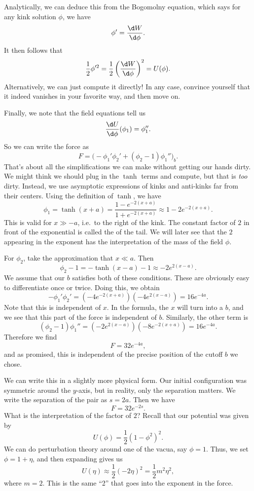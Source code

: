 \documentclass[a4paper]{article}
\begin{document}
Analytically, we can deduce this from the Bogomolny equation, which says for any kink solution $\phi$, we have
\[
  \phi' = \frac{\d W}{\d \phi}.
\]
It then follows that
\[
  \frac{1}{2} \phi'^2 = \frac{1}{2} \left(\frac{\d W}{\d \phi}\right)^2 = U(\phi).
\]
Alternatively, we can just compute it directly! In any case, convince yourself that it indeed vanishes in your favorite way, and then move on.

Finally, we note that the field equations tell us
\[
  \frac{\d U}{\d \phi}(\phi_1) = \phi_1''.
\]
So we can write the force as
\[
  F = \big(-\phi_1' \phi_2' + (\phi_2 - 1) \phi_1''\big)_b.
\]
That's about all the simplifications we can make without getting our hands dirty. We might think we should plug in the $\tanh$ terms and compute, but that is \emph{too} dirty. Instead, we use asymptotic expressions of kinks and anti-kinks far from their centers. Using the definition of $\tanh$, we have
\[
  \phi_1 = \tanh(x + a) = \frac{1 - e^{-2(x + a)}}{1 + e^{-2(x + a)}} \approx 1 - 2e^{-2(x + a)}.
\]
This is valid for $x \gg -a$, i.e.\ to the right of the kink. The constant factor of $2$ in front of the exponential is called the  of the tail. We will later see that the $2$ appearing in the exponent has the interpretation of the mass of the field $\phi$.

For $\phi_2$, take the approximation that $x \ll a$. Then
\[
  \phi_2 - 1= -\tanh(x - a) - 1 \approx -2 e^{2(x - a)}.
\]
We assume that our $b$ satisfies both of these conditions. These are obviously easy to differentiate once or twice. Doing this, we obtain
\[
  -\phi_1' \phi_2' = (-4e^{-2(x + a)})(-4 e^{2(x - a)}) = 16 e^{-4a}.
\]
Note that this is independent of $x$. In the formula, the $x$ will turn into a $b$, and we see that this part of the force is independent of $b$. Similarly, the other term is
\[
  (\phi_2 - 1) \phi_1'' = (-2e^{2(x - a)}) (-8 e^{-2(x + a)}) = 16 e^{-4a}.
\]
Therefore we find
\[
  F = 32 e^{-4a},
\]
and as promised, this is independent of the precise position of the cutoff $b$ we chose.

We can write this in a slightly more physical form. Our initial configuration was symmetric around the $y$-axis, but in reality, only the separation matters. We write the separation of the pair as $s = 2a$. Then we have
\[
  F = 32 e^{-2s}.
\]
What is the interpretation of the factor of $2$? Recall that our potential was given by
\[
  U(\phi) = \frac{1}{2}(1 - \phi^2)^2.
\]
We can do perturbation theory around one of the vacua, say $\phi = 1$. Thus, we set $\phi = 1 + \eta$, and then expanding gives us
\[
  U(\eta) \approx \frac{1}{2} (-2\eta)^2 = \frac{1}{2}m^2 \eta^2,
\]
where $m = 2$. This is the same ``2'' that goes into the exponent in the force.
\end{document}
